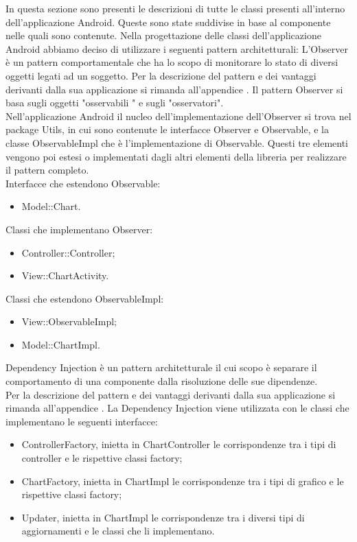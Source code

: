 		
		
		
		In questa sezione sono presenti le descrizioni di tutte le classi presenti all'interno dell'applicazione Android. Queste sono state suddivise in base al componente nelle quali sono contenute.
Nella progettazione delle classi dell'applicazione Android abbiamo deciso di utilizzare i seguenti pattern architetturali:
	L'Observer è un pattern comportamentale che ha lo scopo di monitorare lo stato di diversi oggetti legati ad un soggetto.
	Per la descrizione del pattern e dei vantaggi derivanti dalla sua applicazione si rimanda all'appendice .
	Il pattern Observer si basa sugli oggetti "osservabili " e sugli "osservatori". \\ Nell'applicazione Android il nucleo dell'implementazione dell'Observer si trova nel package Utils, in cui sono contenute le interfacce Observer e Observable, e la classe ObservableImpl che è l'implementazione di Observable. Questi tre elementi vengono poi estesi o implementati dagli altri elementi della libreria per realizzare il pattern completo.\\
	Interfacce che estendono Observable:
	\begin{itemize}
	\item Model::Chart.
	\end{itemize}
	Classi che implementano Observer:
	\begin{itemize}
	\item Controller::Controller;
	\item View::ChartActivity.
	\end{itemize}
	Classi che estendono ObservableImpl:
	\begin{itemize}
	\item View::ObservableImpl;
	\item Model::ChartImpl.
	\end{itemize}
	Dependency Injection è un pattern architetturale il cui scopo è separare il comportamento di una componente dalla risoluzione delle sue dipendenze.\\
	Per la descrizione del pattern e dei vantaggi derivanti dalla sua applicazione si rimanda all'appendice .
	La Dependency Injection viene utilizzata con le classi che implementano le seguenti interfacce:
	\begin{itemize}
	\item ControllerFactory, inietta in ChartController le corrispondenze tra i tipi di controller e le rispettive classi factory;
	\item ChartFactory, inietta in ChartImpl le  corrispondenze tra i tipi di grafico e le rispettive classi factory;
	\item Updater, inietta in ChartImpl le corrispondenze tra i diversi tipi di aggiornamenti e le classi che li implementano.
	\end{itemize}
